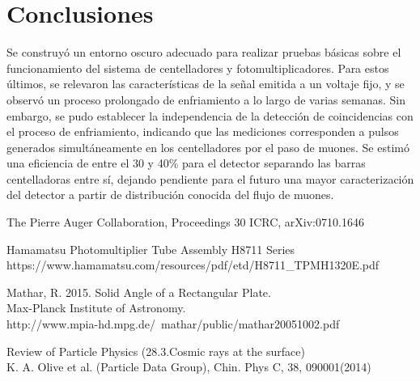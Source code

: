 \documentclass[12pt,a4paper]{article}
\numberwithin{equation}{section}
\begin{document}






\section{Conclusiones}

Se construyó un entorno oscuro adecuado para realizar pruebas básicas sobre el funcionamiento del sistema de centelladores y fotomultiplicadores. Para estos últimos, se relevaron las características de la señal emitida a un voltaje fijo, y se observó un proceso prolongado de enfriamiento a lo largo de varias semanas. Sin embargo, se pudo establecer la independencia de la detección de coincidencias con el proceso de enfriamiento, indicando que las mediciones corresponden a pulsos generados simultáneamente en los centelladores por el paso de muones. Se estimó una eficiencia de entre el 30 y 40\% para el detector separando las barras centelladoras entre sí, dejando pendiente para el futuro una mayor caracterización del detector a partir de distribución conocida del flujo de muones.



\begin{thebibliography}{9}
	
	The Pierre Auger Collaboration, Proceedings 30 ICRC, arXiv:0710.1646
	
	Hamamatsu Photomultiplier Tube Assembly H8711 Series\\
	https://www.hamamatsu.com/resources/pdf/etd/H8711\_TPMH1320E.pdf
	
	Mathar, R. 2015. Solid Angle of a Rectangular Plate. \\Max-Planck Institute of Astronomy.\\ http://www.mpia-hd.mpg.de/~mathar/public/mathar20051002.pdf 
	
	Review of Particle Physics (28.3.Cosmic rays at the surface)\\
	K. A. Olive et al. (Particle Data Group), Chin. Phys C, 38, 090001(2014)
	
\end{thebibliography}
\end{document}
